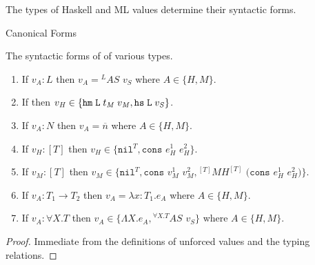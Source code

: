 The types of Haskell and ML values determine their syntactic forms.

\begin{lemma}{Canonical Forms}

\label{lemcan}

The syntactic forms of \profvs of various types.

\begin{enumerate}

\item If $v_{A}:L$ then $v_{A}={^{L}A}S$ $v_{S}$ where $A\in\lbrace H,M\rbrace$.

\item If \judeh{\env}{\varvalfh}{\tylump} then $v_{\mathit{H}} \in \lbrace \mathtt{hm} \; \mathtt{L} \; t_{\mathit{M}} \; v_{\mathit{M}}, \mathtt{hs} \; \mathtt{L} \; v_{\mathit{S}} \rbrace$.

\item If $v_{A}:N$ then $v_{A}=\overline{n}$ where $A\in\lbrace H,M\rbrace$.

\item If $v_{H}:[T]$ then $v_{H}\in\lbrace\mathtt{nil}^{T},\mathtt{cons}$ $e_{H}^{1}$ $e_{H}^{2}\rbrace$.

\item If $v_{M}:[T]$ then $v_{M}\in\lbrace\mathtt{nil}^{T},\mathtt{cons}$ $v_{M}^{1}$ $v_{M}^{2},{^{[T]}M}H^{[T]}$ $(\mathtt{cons}$ $e_{H}^{1}$ $e_{H}^{2})\rbrace$.

\item If $v_{A}:T_{1}\rightarrow T_{2}$ then $v_{A}=\lambda x:T_{1}.e_{A}$ where $A\in\lbrace H,M\rbrace$.

\item If $v_{A}:\forall X.T$ then $v_{A}\in\lbrace\Lambda X.e_{A},{^{\forall X.T}A}S$ $v_{S}\rbrace$ where $A\in\lbrace H,M\rbrace$.

\end{enumerate}

\begin{proof}

Immediate from the definitions of unforced values and the typing relations.

\end{proof}

\end{lemma}
